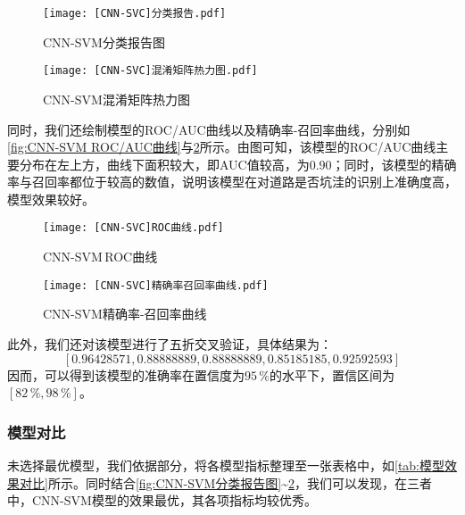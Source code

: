 \documentclass{MathorCupmodeling}
\begin{document}
\begin{itemize}
\begin{figure}[H]
	\centering
	\begin{minipage}{0.48\linewidth}
		\centering
		\texttt{[image: [CNN-SVC]分类报告.pdf]}
		\caption{CNN-SVM分类报告图}
		\label{fig:CNN-SVM分类报告图}
	\end{minipage}
	\begin{minipage}{0.48\linewidth}
		\centering
		\texttt{[image: [CNN-SVC]混淆矩阵热力图.pdf]}
		\caption{CNN-SVM混淆矩阵热力图}
		\label{fig:CNN-SVM混淆矩阵热力图}
	\end{minipage}
\end{figure}

同时，我们还绘制模型的ROC/AUC曲线以及精确率-召回率曲线，分别如\textcolor{blue}{\cref{fig:CNN-SVM ROC/AUC曲线}}与\textcolor{blue}{\cref{fig:CNN-SVM精确率召回率曲线}}所示。由图可知，该模型的ROC/AUC曲线主要分布在左上方，曲线下面积较大，即AUC值较高，为$0.90$；同时，该模型的精确率与召回率都位于较高的数值，说明该模型在对道路是否坑洼的识别上准确度高，模型效果较好。

\begin{figure}[H]
	\centering
	\begin{minipage}{0.48\linewidth}
		\centering
		\texttt{[image: [CNN-SVC]ROC曲线.pdf]}
		\caption{CNN-SVM\,ROC曲线}
		\label{fig:CNN-SVM ROC/AUC曲线}
	\end{minipage}
	\begin{minipage}{0.48\linewidth}
		\centering
		\texttt{[image: [CNN-SVC]精确率召回率曲线.pdf]}
		\caption{CNN-SVM精确率-召回率曲线}
		\label{fig:CNN-SVM精确率召回率曲线}
	\end{minipage}
\end{figure}
	\end{itemize}

	此外，我们还对该模型进行了五折交叉验证，具体结果为：
	$$
	[0.96428571, 0.88888889, 0.88888889,0.85185185, 0.92592593]
	$$
	因而，可以得到该模型的准确率在置信度为$95\,\%$的水平下，置信区间为$\left[82\,\%, 98\,\%\right]$。
	\subsubsection{模型对比}
	未选择最优模型，我们依据\textcolor{blue}{}部分，将各模型指标整理至一张表格中，如\textcolor{blue}{\cref{tab:模型效果对比}}所示。同时结合\textcolor{blue}{\cref{fig:CNN-SVM分类报告图}}\textasciitilde\textcolor{blue}{\cref{fig:CNN-SVM精确率召回率曲线}}，我们可以发现，在三者中，CNN-SVM模型的效果最优，其各项指标均较优秀。
\end{document}
